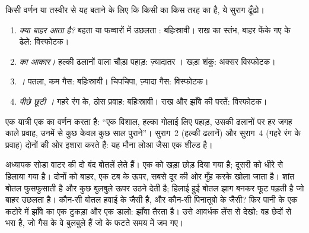\begin{method}[बहिःस्रावी या विस्फोटक? चार सुराग]\label{met:g7:volcanoes:clues}
किसी वर्णन या तस्वीर से यह बताने के लिए कि किसी  का  किस तरह का
है, ये सुराग ढूँढो।
\begin{enumerate}
  \item \emph{क्या बाहर आता है?} बहता या फव्वारों में उछलता :
        बहिःस्रावी। राख का स्तंभ, बाहर फेंके गए  के ढेले: विस्फोटक।
  \item \emph{ का आकार।} हल्की ढलानों वाला चौड़ा पहाड़: ज़्यादातर
        । खड़ा शंकु: अक्सर विस्फोटक।
  \item \emph{।} पतला, कम गैस: बहिःस्रावी। चिपचिपा, ज़्यादा गैस:
        विस्फोटक।
  \item \emph{पीछे छूटी ।} गहरे रंग के, ठोस  प्रवाह: बहिःस्रावी।
        राख और झाँवे की परतें: विस्फोटक।
\end{enumerate}
\end{method}

\begin{example}[सुरागों का उपयोग]\label{ex:g7:volcanoes:clues}
एक यात्री एक  का वर्णन करता है: ``एक विशाल, हल्का गोलाई लिए पहाड़,
उसकी ढलानों पर हर जगह काले  प्रवाह, उनमें से कुछ केवल कुछ साल पुराने''।
सुराग~2 (हल्की ढलानें) और सुराग~4 (गहरे रंग के  प्रवाह) दोनों  की ओर इशारा करते हैं: यह मौना लोआ जैसा एक शील्ड  है।
\end{example}

\begin{inthelab}[बोतल में ज्वालामुखी (कक्षा में, अध्यापक के साथ)]
अध्यापक सोडा वाटर की दो बंद बोतलें लेते हैं। एक को खड़ा छोड़ दिया गया है; दूसरी
को धीरे से हिलाया गया है। दोनों को बाहर, एक टब के ऊपर, सबसे दूर की ओर मुँह करके
खोला जाता है। शांत बोतल फुसफुसाती है और कुछ बुलबुले ऊपर उठने देती है; हिलाई
हुई बोतल झाग बनकर फूट पड़ती है जो बाहर उछलता है। कौन-सी बोतल हवाई के 
जैसी है, और कौन-सी पिनातूबो के  जैसी? फिर पानी के एक कटोरे में झाँवे का
एक टुकड़ा और एक  डालो: झाँवा तैरता है। उसे आवर्धक लेंस से देखो: वह छेदों
से भरा है, जो गैस के वे बुलबुले हैं जो  के फटते समय  में जम
गए।
\end{inthelab}

